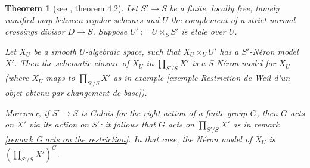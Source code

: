 \documentclass{article}
\newtheorem{thm}{Theorem}[section]
\theoremstyle{definition}
\theoremstyle{remark}
\begin{document}
\begin{thm}[see \cite{TameRamification}, theorem 4.2]\label{theorem the neron model descends}
Let $S'\longrightarrow S$ be a finite, locally free, tamely ramified map between regular schemes and $U$ the complement of a strict normal crossings divisor $D\longrightarrow S$. Suppose $U':=U\times_S S'$ is \'etale over $U$.

Let $X_U$ be a smooth $U$-algebraic space, such that $X_U\times_U U'$ has a $S'$-N\'eron model $X'$. Then the schematic closure of $X_U$ in $\prod\limits_{S'/S}X'$ is a $S$-N\'eron model for $X_U$ (where $X_U$ maps to $\prod\limits_{S'/S}X'$ as in example \ref{exemple Restriction de Weil d'un objet obtenu par changement de base}).

Moreover, if $S'\longrightarrow S$ is Galois for the right-action of a finite group $G$, then $G$ acts on $X'$ via its action on $S'$: it follows that $G$ acts on $\prod\limits_{S'/S}X'$ as in remark \ref{remark G acts on the restriction}. In that case, the N\'eron model of $X_U$ is $(\prod\limits_{S'/S}X')^G$.
\end{thm}
\end{document}
